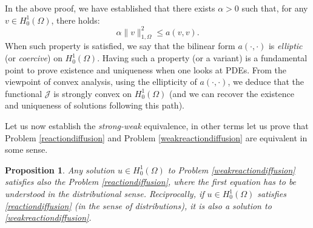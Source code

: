 \documentclass{article}
\newtheorem{proposition}{Proposition}
\begin{document}
\medskip


In the above proof, we have established that there exists $\alpha > 0$ such that, for any $v \in H^1_0(\Omega)$, there holds:
\[
\alpha \| v \|^2_{1,\Omega}
\leq
 a(v,v).
\]
When such property is satisfied, we say that the bilinear form $a(\cdot,\cdot)$ is \emph{elliptic} (or \emph{coercive}) on $H^1_0(\Omega)$. Having such a property (or a variant) is a fundamental point to prove existence and uniqueness when one looks at PDEs. From the viewpoint of convex analysis, using the ellipticity of $a(\cdot,\cdot)$, we deduce that the functional $\mathcal{J}$ is strongly convex on $H^1_0(\Omega)$ (and we can recover the existence and uniqueness of solutions following this path). 

Let us now establish the \emph{strong-weak} equivalence, in other terms let us prove that Problem \eqref{reactiondiffusion} and Problem \eqref{weakreactiondiffusion} are equivalent in some sense.

\begin{proposition}
Any solution $u \in H^1_0(\Omega)$ to Problem \eqref{weakreactiondiffusion} satisfies also the Problem \eqref{reactiondiffusion}, where the first equation has to be understood in the distributional sense. Reciprocally, if $u \in H^1_0(\Omega)$ satisfies \eqref{reactiondiffusion} (in the sense of distributions), it is also a solution to \eqref{weakreactiondiffusion}.
\end{proposition}
\end{document}

